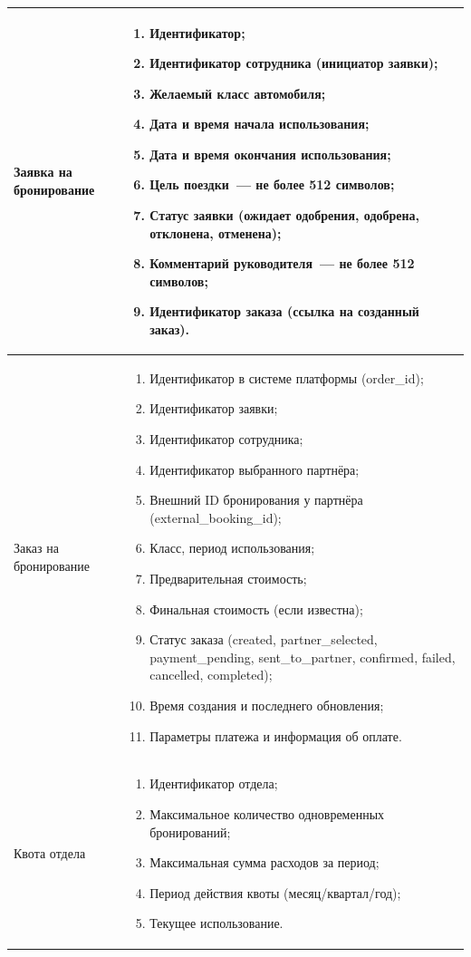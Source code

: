 \documentclass{bmstu}
\begin{document}
\begin{longtable}{|p{}|p{}|}
Заявка на бронирование & 
\begin{enumerate}
    \item Идентификатор;
    \item Идентификатор сотрудника (инициатор заявки);
    \item Желаемый класс автомобиля;
    \item Дата и время начала использования;
    \item Дата и время окончания использования;
    \item Цель поездки~--- не более 512 символов;
    \item Статус заявки (ожидает одобрения, одобрена, отклонена, отменена);
    \item Комментарий руководителя~--- не более 512 символов;
    \item Идентификатор заказа (ссылка на созданный заказ).
\end{enumerate} \\
\hline

Заказ на бронирование & 
\begin{enumerate}
    \item Идентификатор в системе платформы (order\_id);
    \item Идентификатор заявки;
    \item Идентификатор сотрудника;
    \item Идентификатор выбранного партнёра;
    \item Внешний ID бронирования у партнёра (external\_booking\_id);
    \item Класс, период использования;
    \item Предварительная стоимость;
    \item Финальная стоимость (если известна);
    \item Статус заказа (created, partner\_selected, payment\_pending, sent\_to\_partner, confirmed, failed, cancelled, completed);
    \item Время создания и последнего обновления;
    \item Параметры платежа и информация об оплате.
\end{enumerate} \\
\hline

Квота отдела & 
\begin{enumerate}
    \item Идентификатор отдела;
    \item Максимальное количество одновременных бронирований;
    \item Максимальная сумма расходов за период;
    \item Период действия квоты (месяц/квартал/год);
    \item Текущее использование.
\end{enumerate} \\
\hline

\end{longtable}
\end{document}
